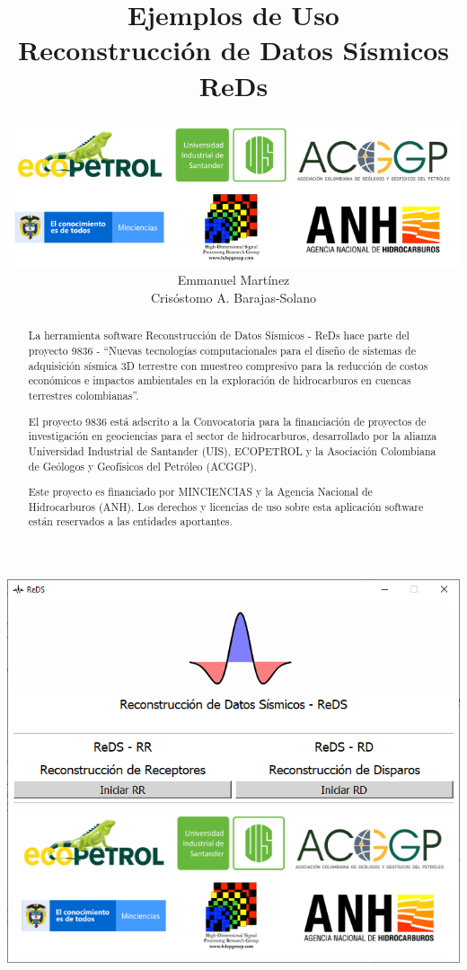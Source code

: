 \documentclass[12pt,twoside,letter]{ol-softwaremanual}
\title{\large{Ejemplos de Uso}\\ \vspace{10mm} \huge{Reconstrucción de Datos Sísmicos}\\ \vspace{5mm} \huge{ReDs}}
\author{\includegraphics[width=14cm]{figures/all_logos3.png} \\ Emmanuel Martínez \\ Crisóstomo A. Barajas-Solano}
\begin{document}
\maketitle

\newpage\null\thispagestyle{empty}\newpage

\begin{center}
\includegraphics[width=.65\linewidth]{launch.png}
\end{center}
\begin{abstract}
La herramienta software Reconstrucción de Datos Sísmicos - ReDs hace parte del proyecto 9836 - ``Nuevas tecnologías computacionales para el diseño de sistemas de adquisición sísmica 3D terrestre con muestreo compresivo para la reducción de costos económicos e impactos ambientales en la exploración de hidrocarburos en cuencas terrestres colombianas''.

El proyecto 9836 está adscrito a la Convocatoria para la financiación de proyectos de investigación en geociencias para el sector de hidrocarburos, desarrollado por la alianza Universidad Industrial de Santander (UIS), ECOPETROL y la Asociación Colombiana de Geólogos y Geofísicos del Petróleo (ACGGP). 

Este proyecto es financiado por MINCIENCIAS y la Agencia Nacional de Hidrocarburos (ANH). Los derechos y licencias de uso sobre esta aplicación software están reservados a las entidades aportantes.
\end{abstract}
\end{document}
